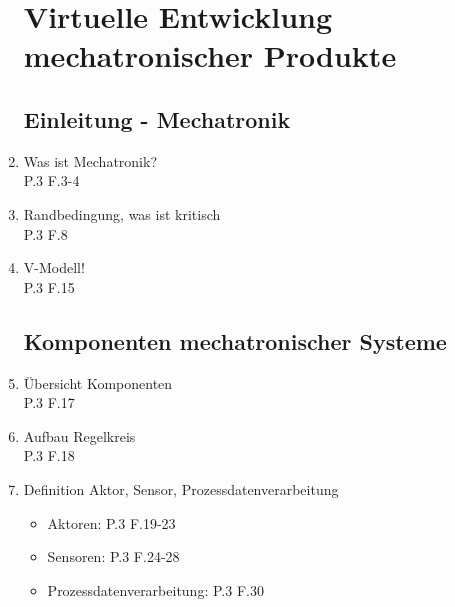 \documentclass[10pt,a4paper,fleqn]{article}
\begin{document}
\begin{enumerate}
\section{Virtuelle Entwicklung mechatronischer Produkte}
\subsection{Einleitung - Mechatronik}
	\item Was ist Mechatronik?\\
		P.3 F.3-4
	\item Randbedingung, was ist kritisch\\
		P.3 F.8
	\item V-Modell!\\
		P.3 F.15
\subsection{Komponenten mechatronischer Systeme}
	\item Übersicht Komponenten\\
		P.3 F.17
	\item Aufbau Regelkreis\\
		P.3 F.18
	\item Definition Aktor, Sensor, Prozessdatenverarbeitung
		\begin{itemize}
		 	\item Aktoren: P.3 F.19-23
		 	\item Sensoren: P.3 F.24-28
		 	\item Prozessdatenverarbeitung: P.3 F.30
		 \end{itemize}

\end{enumerate}
\end{document}
